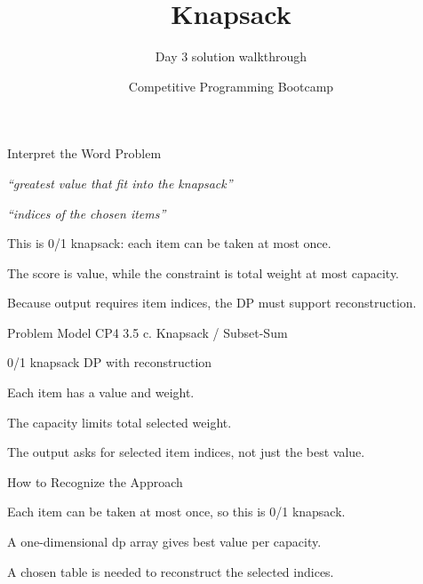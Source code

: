 \documentclass[aspectratio=169,11pt]{beamer}
\title[knapsack]{Knapsack}
\subtitle{Day 3 solution walkthrough}
\author[Solution Deck]{Competitive Programming Bootcamp}
\date{}
\begin{document}
\begin{frame}[plain]
  \titlepage
\end{frame}

\begin{frame}{Interpret the Word Problem}
\small
{}
\begin{tightitemize}
  \item \textit{``greatest value that fit into the knapsack''}
  \item \textit{``indices of the chosen items''}
\end{tightitemize}

\vspace{0.18cm}
\begin{tightitemize}
  \item This is 0/1 knapsack: each item can be taken at most once.
  \item The score is value, while the constraint is total weight at most capacity.
  \item Because output requires item indices, the DP must support reconstruction.
\end{tightitemize}
\end{frame}







\begin{frame}{Problem Model}
\small
{} CP4 3.5 c. Knapsack / Subset-Sum

\vspace{0.25cm}
 0/1 knapsack DP with reconstruction

\vspace{0.25cm}
\begin{tightitemize}
  \item Each item has a value and weight.
  \item The capacity limits total selected weight.
  \item The output asks for selected item indices, not just the best value.
\end{tightitemize}
\end{frame}

\begin{frame}{How to Recognize the Approach}
\begin{tightitemize}
  \item Each item can be taken at most once, so this is 0/1 knapsack.
  \item A one-dimensional dp array gives best value per capacity.
  \item A chosen table is needed to reconstruct the selected indices.
\end{tightitemize}
\end{frame}
\end{document}
